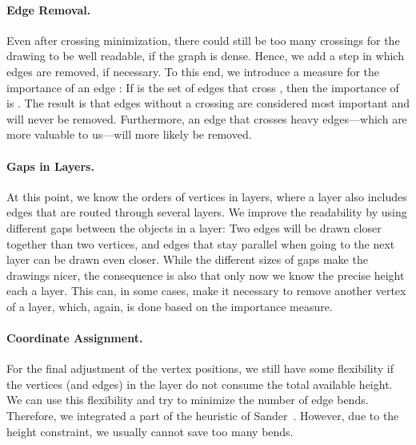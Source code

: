 \documentclass[]{llncs}
\begin{document}
\paragraph{Edge Removal.}
Even after crossing minimization, there could still be too many
crossings for the drawing to be well readable, if the graph is dense.
Hence, we add a step in
which edges are removed, if necessary. To this end, we introduce a
measure for the importance of an edge : If  is the set of
edges that cross , then the importance of  is . The result is that edges without a
crossing are considered most important and will never be removed.
Furthermore, an edge that crosses heavy edges---which are more
valuable to us---will more likely be removed.

\paragraph{Gaps in Layers.}
At this point, we know the orders of vertices in layers,
where a layer also includes edges that are routed through several
layers. We improve the readability by using different
gaps between the objects in a layer: Two edges will be drawn closer
together than two vertices, and edges that stay parallel when going to
the next layer can be drawn even closer. While the different sizes of
gaps make the drawings nicer, the consequence is also that only now we
know the precise height each a layer. This can, in some cases, make it
necessary to remove another vertex of a layer, which, again, is done
based on the importance measure.

\paragraph{Coordinate Assignment.}
For the final adjustment of the vertex positions, we still have some
flexibility if the vertices (and edges) in the layer do not consume
the total available height. We can use this flexibility and try to
minimize the number of edge bends.
Therefore, we integrated a part of the
heuristic of Sander~\cite{sander1996fast}. However, due to the height
constraint, we usually cannot save too many bends.
\end{document}
